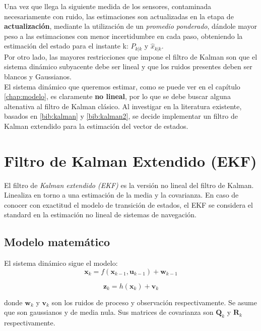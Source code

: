\documentclass[main]{subfiles}
\begin{document}
Una vez que llega la siguiente medida de los sensores, contaminada necesariamente con ruido, las estimaciones son actualizadas en la etapa de \textbf{actualización}, mediante la utilización de un \emph{promedio ponderado}, dándole mayor peso a las estimaciones con menor incertidumbre en cada paso, obteniendo la estimación del estado para el instante k: $P_{k|k}$ y $\hat{x}_{k|k}$.\\

Por otro lado, las mayores restricciones que impone el filtro de Kalman son que el sistema dinámico subyacente debe ser lineal y que los ruidos presentes deben ser blancos y Gaussianos.\\

El sistema dinámico que queremos estimar, como se puede ver en el capítulo \ref{chap:modelo}, es claramente \textbf{no lineal}, por lo que se debe buscar alguna altenativa al filtro de Kalman clásico. Al investigar en la literatura existente, basados en \ref{bib:kalman} y \ref{bib:kalman2}, se decide implementar un filtro de Kalman extendido para la estimación del vector de estados.

\section{Filtro de Kalman Extendido (EKF)}

El filtro de \emph{Kalman extendido (EKF)} es la versión no lineal del filtro de Kalman. Linealiza en torno a una estimación de la media y la covarianza. En caso de conocer con exactitud el modelo de transición de estados, el EKF se considera el standard en la estimación no lineal de sistemas de navegación.\\

\subsection{Modelo matemático}

El sistema dinámico sigue el modelo:\\

$$\mathbf{x}_{k} = f(\mathbf{x}_{k-1}, \mathbf{u}_{k-1}) + \mathbf{w}_{k-1}$$

$$\mathbf{z}_{k} = h(\mathbf{x}_{k}) + \mathbf{v}_{k}$$

donde $\mathbf{w}_k$ y $\mathbf{v}_k$ son los ruidos de proceso y observación respectivamente. Se asume que son gaussianos y de media nula. Sus matrices de covarianza son $\mathbf{Q}_k$ y $\mathbf{R}_k$ respectivamente.
\end{document}
